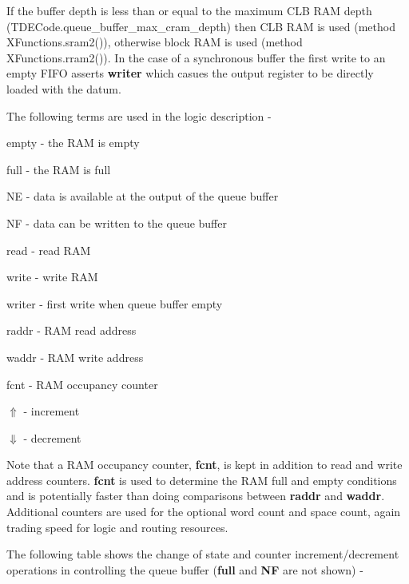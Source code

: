         If the buffer depth is less than or equal to the maximum CLB RAM
        depth (TDECode.queue\_buffer\_max\_cram\_depth) then CLB RAM is
        used (method XFunctions.sram2()), otherwise block RAM is used
        (method XFunctions.rram2()). In the case of a synchronous buffer
        the first write to an empty FIFO asserts {\bf writer} which 
        casues the output register to be directly loaded with the datum.


        The following terms are used in the logic description -

        \blist
        \item   empty - the RAM is empty
        \item   full - the RAM is full
        \item   NE - data is available at the output of the queue buffer
        \item   NF - data can be written to the queue buffer
        \item   read - read RAM
        \item   write - write RAM
        \item   writer - first write when queue buffer empty
        \item   raddr - RAM read address
        \item   waddr - RAM write address
        \item   fcnt - RAM occupancy counter
        \item   $\Uparrow$ - increment
        \item   $\Downarrow$ - decrement
        \blend

        Note that a RAM occupancy counter, {\bf fcnt}, is kept in
        addition to read and write address counters. {\bf fcnt} is
        used to determine the RAM full and empty conditions and is
        potentially faster than doing comparisons between {\bf
        raddr} and {\bf waddr}. Additional counters are used for the
        optional word count and space count, again trading speed for
        logic and routing resources.

        The following table shows the change of state and counter
        increment/decrement operations in controlling the queue
        buffer ({\bf full} and {\bf NF} are not shown) -

